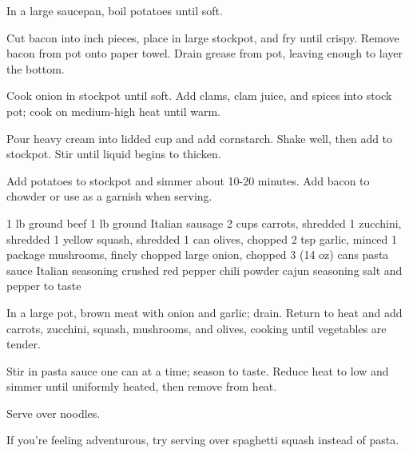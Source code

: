 \begin{method}
  In a large saucepan, boil potatoes until soft.

  Cut bacon into  inch pieces,
  place in large stockpot, and fry until crispy.
  Remove bacon from pot onto paper towel.
  Drain grease from pot, leaving enough to layer the bottom.

  Cook onion in stockpot until soft.
  Add clams, clam juice, and spices into stock pot;
  cook on medium-high heat until warm.

  Pour heavy cream into lidded cup and add cornstarch.
  Shake well, then add to stockpot.
  Stir until liquid begins to thicken.

  Add potatoes to stockpot and simmer about 10-20 minutes.
  Add bacon to chowder or use as a garnish when serving.
\end{method}

\freezerfriendly
\begin{ingreds}
  1 lb ground beef
  1 lb ground Italian sausage
  2 cups carrots, shredded
  1 zucchini, shredded
  1 yellow squash, shredded
  1 can olives, chopped
  2 tsp garlic, minced
  1 package mushrooms, finely chopped
   large onion, chopped
  3 (14 oz) cans pasta sauce
  Italian seasoning
  crushed red pepper
  chili powder
  cajun seasoning
  salt and pepper to taste
\end{ingreds}

\begin{method}
  In a large pot, brown meat with onion and garlic; drain.
  Return to heat and add carrots, zucchini, squash,
  mushrooms, and olives, cooking until vegetables are tender.

  Stir in pasta sauce one can at a time; season to taste.
  Reduce heat to low and simmer until uniformly heated,
  then remove from heat.

  Serve over noodles.
\end{method}
\begin{tips}
  If you're feeling adventurous, try serving
  over spaghetti squash instead of pasta.
\end{tips}

